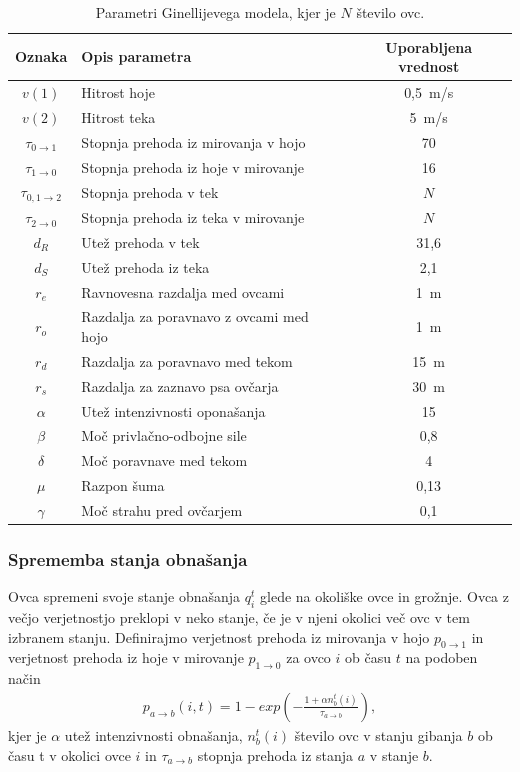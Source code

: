 \begin{table}[ht]
	\begin{center}
		\begin{tabular}{ c|l|c }
			\hline
			\textbf{Oznaka} & \textbf{Opis parametra} & \textbf{Uporabljena vrednost} \\ \hline  
			$v(1)$ & Hitrost hoje & 0,5~m/s \\ 
			$v(2)$ & Hitrost teka & 5~m/s \\ 
			$\tau_{0\rightarrow1}$ & Stopnja prehoda iz mirovanja v hojo & 70 \\ 
			$\tau_{1\rightarrow0}$ & Stopnja prehoda iz hoje v mirovanje & 16 \\ 
			$\tau_{0,1\rightarrow2}$ & Stopnja prehoda v tek & $N$ \\ 
			$\tau_{2\rightarrow0}$ & Stopnja prehoda iz teka v mirovanje & $N$ \\ 
			$d_R$ & Utež prehoda v tek & 31,6 \\ 
			$d_S$ & Utež prehoda iz teka & 2,1 \\ 
			$r_e$ & Ravnovesna razdalja med ovcami & 1~m \\ 
			$r_o$ & Razdalja za poravnavo z ovcami med hojo & 1~m \\ 
			$r_d$ & Razdalja za poravnavo med tekom & 15~m \\ 
			$r_s$ & Razdalja za zaznavo psa ovčarja & 30~m \\
			$\alpha$ & Utež intenzivnosti oponašanja & 15 \\ 
			$\beta$ & Moč privlačno-odbojne sile & 0,8 \\ 
			$\delta$ & Moč poravnave med tekom & 4 \\ 
			$\mu$ & Razpon šuma & 0,13 \\ 
			$\gamma$ & Moč strahu pred ovčarjem & 0,1 \\ 
			\hline
		\end{tabular}
	\end{center}
	\caption[Parametri Ginellijevega modela gibanja ovc]{Parametri Ginellijevega modela, kjer je $N$ število ovc.}
	\label{table:ginelli}
\end{table}

\subsubsection{Sprememba stanja obnašanja}

Ovca spremeni svoje stanje obnašanja $q_i^t$ glede na okoliške ovce in grožnje. Ovca z večjo verjetnostjo preklopi v neko stanje, če je v njeni okolici več ovc v tem izbranem stanju. Definirajmo verjetnost prehoda iz mirovanja v hojo $p_{0\rightarrow1}$ in verjetnost prehoda iz hoje v mirovanje $p_{1\rightarrow0}$ za ovco $i$ ob času $t$ na podoben način
\begin{align}
p_{a\rightarrow b}(i, t)=1 - exp(-\frac{1+\alpha n_b^t(i)}{\tau_{a\rightarrow b}}), \label{eq:stanje-hoja}
\end{align}
kjer je $\alpha$ utež intenzivnosti obnašanja, $n_b^t(i)$ število ovc v stanju gibanja $b$ ob času t v okolici ovce $i$ in $\tau_{a\rightarrow b}$ stopnja prehoda iz stanja $a$ v stanje $b$.

